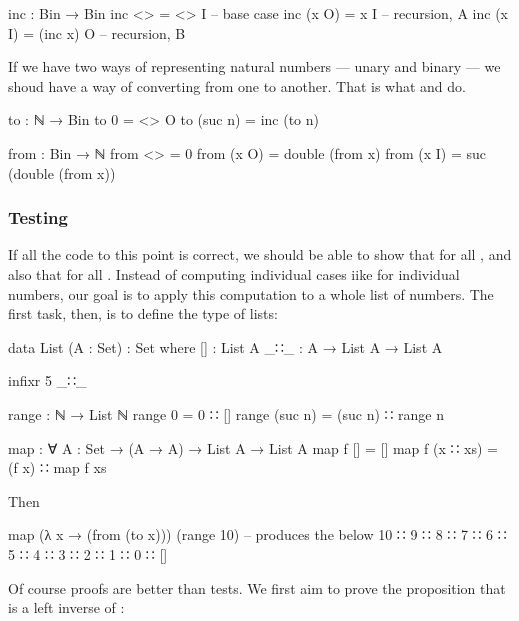 \begin{colored}[elm]
inc : Bin → Bin
inc <> = <> I          -- base case
inc (x O) = x I        -- recursion, A
inc (x I) = (inc x) O  -- recursion, B
\end{colored}

If we have two ways of representing natural numbers — unary and binary — we shoud have a way of converting from one to another.  That is what  and 
 do.

\begin{colored}[elm]
to : ℕ → Bin
to 0 = <> O
to (suc n) = inc (to n)

from : Bin → ℕ
from <> = 0
from (x O) = double (from x)
from (x I) = suc (double  (from x))
\end{colored}

\subsubsection{Testing}

If all the code to this point is correct, we should be able to show that 
 for all , and also that  for all
. Instead of computing individual cases iike  for individual numbers, our goal is to apply this computation to a whole list of numbers.  The first task, then, is to define the type of lists:

\begin{colored}[elm]
data List (A : Set) : Set where
  []  : List A
  _∷_ : A → List A → List A

infixr 5 _∷_
\end{colored}

\begin{colored}[elm]
range : ℕ → List ℕ
range 0 = 0 ∷ []
range (suc n) = (suc n) ∷ range n

map : ∀ {A : Set} → (A → A) → List A → List A
map f [] = []
map f (x ∷ xs) = (f x) ∷ map f xs
\end{colored}

Then

\begin{colored}[elm]
map (λ x → (from (to x))) (range 10)
-- produces the below
10 ∷ 9 ∷ 8 ∷ 7 ∷ 6 ∷ 5 ∷ 4 ∷ 3 ∷ 2 ∷ 1 ∷ 0 ∷ []
\end{colored}

Of course proofs are better than tests.  We first aim to prove the proposition that  is a left inverse of :

